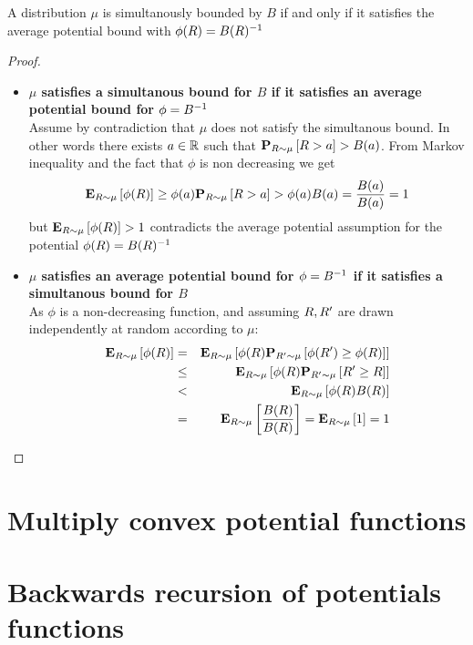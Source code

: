 \documentclass[12pt]{article} %
\begin{document}
\begin{theorem}
 A distribution $\mu$ is simultanously bounded by $B$ if and only
 if it satisfies the average potential bound with $\phi(R) = B(R)^{-1}$
\end{theorem}
\begin{proof}
  \begin{itemize}
  \item
  {\bf $\mu$ satisfies a simultanous bound for $B$ if it satisfies an
  average potential bound for $\phi = B^{-1}$}\\
Assume by contradiction that $\mu$ does not satisfy the simultanous bound. In
other words there exists $a \in \mathbb{R}$ such that
${\bf P}_{R \sim \mu}\left[ R > a \right] > B(a)$. From Markov inequality and the fact
that $\phi$ is non decreasing we get
\[
  {\bf E}_{R \sim \mu}\left[ \phi(R) \right] \geq \phi(a) {\bf P}_{R \sim \mu}\left[ R > a \right] >
  \phi(a) B(a) = \frac{B(a)}{B(a)}=1
\]
but $ {\bf E}_{R \sim \mu}\left[ \phi(R) \right] >1$ contradicts the average potential
assumption for the potential $\phi(R) = B(R)^{-1}$
\item
{\bf $\mu$ satisfies an
  average potential bound for $\phi = B^{-1}$ if it satisfies a simultanous bound for $B$}\\
As $\phi$ is a non-decreasing function, and assuming $R,R'$ are drawn
independently at random according to $\mu$:
\begin{eqnarray}
  {\bf E}_{R \sim \mu}\left[ \phi(R) \right] & = & {\bf E}_{R \sim \mu}\left[ \phi(R)
                                  {\bf P}_{R' \sim \mu}\left[ \phi(R') \geq \phi(R) \right] \right] \\
                            & \leq & {\bf E}_{R \sim \mu}\left[ \phi(R)
                                     {\bf P}_{R' \sim \mu}\left[ R' \geq R \right] \right] \\
                            & < & {\bf E}_{R \sim \mu}\left[ \phi(R) B(R) \right] \\
                            & = & {\bf E}_{R \sim \mu}\left[ \frac{B(R)}{B(R)} \right]
                                  = {\bf E}_{R \sim \mu}\left[ 1 \right] = 1
\end{eqnarray}
\end{itemize}
\end{proof}

\section{Multiply convex potential functions}

\section{Backwards recursion of potentials functions}
\end{document}
